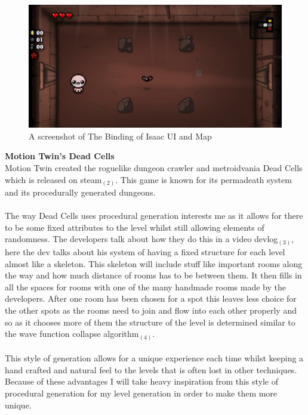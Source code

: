 \documentclass{article}
\begin{document}
        \begin{figure}[h]
                \centering
                \includegraphics[scale=0.25]{images/research/BOI_Capture.PNG}
                \caption{A screenshot of The Binding of Isaac UI and Map}
        \end{figure}
        \newpage
        \[\]
        \textbf{Motion Twin's Dead Cells}\\
        Motion Twin created the roguelike dungeon crawler and metroidvania Dead Cells which is released on steam$_{(2)}$. This game is known for its permadeath system and its procedurally generated dungeons.\\
        \\
        The way Dead Cells uses procedural generation interests me as it allows for there to be some fixed attributes to the level whilst still allowing elements of randomness. The developers talk about how they do this in a video devlog$_{(3)}$, here the dev talks about his system of having a fixed structure for each level almost like a skeleton. This skeleton will include stuff like important rooms along the way and how much distance of rooms has to be between them. It then fills in all the spaces for rooms with one of the many handmade rooms made by the developers. After one room has been chosen for a spot this leaves less choice for the other spots as the rooms need to join and flow into each other properly and so as it chooses more of them the structure of the level is determined similar to the wave function collapse algorithm$_{(4)}$.\\
        \\
        This style of generation allows for a unique experience each time whilst keeping a hand crafted and natural feel to the levels that is often lost in other techniques. Because of these advantages I will take heavy inspiration from this style of procedural generation for my level generation in order to make them more unique.\\
\end{document}
